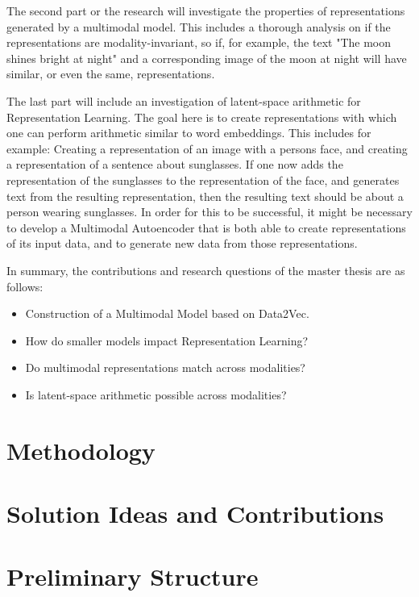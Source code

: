 The second part or the research will investigate the properties of
representations generated by a multimodal model. This includes a thorough analysis on if
the representations are modality-invariant, so if, for example, the text "The moon shines bright at night"
and a corresponding image of the moon at night will have similar, or even the same, representations.

The last part will include an investigation of latent-space arithmetic for Representation Learning.
The goal here is to create representations with which one can perform arithmetic similar to word embeddings.
This includes for example: Creating a representation of an image with a persons face, and creating
a representation of a sentence about sunglasses. If one now adds the representation of the sunglasses to
the representation of the face, and generates text from the resulting representation, then the resulting text
should be about a person wearing sunglasses.
In order for this to be successful, it might be necessary to develop a Multimodal Autoencoder that is both
able to create representations of its input data, and to generate new data from those representations.

In summary, the contributions and research questions of the master thesis are as follows:

\begin{itemize}
	\item Construction of a Multimodal Model based on Data2Vec.
	\item How do smaller models impact Representation Learning?
    \item Do multimodal representations match across modalities?
	\item Is latent-space arithmetic possible across modalities?
\end{itemize}

\section{Methodology}

\section{Solution Ideas and Contributions}

\section{Preliminary Structure}

